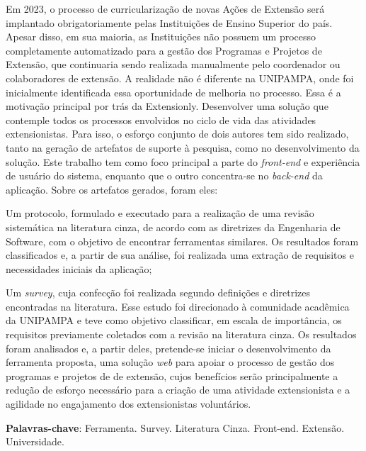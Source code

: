 \begin{resumo}
  Em 2023, o processo de curricularização de novas Ações de Extensão será implantado obrigatoriamente pelas Instituições de Ensino Superior do país. Apesar disso, em sua maioria, as Instituições não possuem um processo completamente automatizado para a gestão dos Programas e Projetos de Extensão, que continuaria sendo realizada manualmente pelo coordenador ou colaboradores de extensão. A realidade não é diferente na \acs{UNIPAMPA}, onde foi inicialmente identificada essa oportunidade de melhoria no processo. Essa é a motivação principal por trás da Extensionly. Desenvolver uma solução que contemple todos os processos envolvidos no ciclo de vida das atividades extensionistas. Para isso, o esforço conjunto de dois autores tem sido realizado, tanto na geração de artefatos de suporte à pesquisa, como no desenvolvimento da solução. Este trabalho tem como foco principal a parte do \textit{front-end} e experiência de usuário do sistema, enquanto que o outro concentra-se no \textit{back-end} da aplicação. Sobre os artefatos gerados, foram eles:
  \begin{inparaenum}[(a)]
    \item Um protocolo, formulado e executado para a realização de uma revisão sistemática na literatura cinza, de acordo com as diretrizes da Engenharia de Software, com o objetivo de encontrar ferramentas similares. Os resultados foram classificados e, a partir de sua análise, foi realizada uma extração de requisitos e necessidades iniciais da aplicação;
    \item Um \textit{survey}, cuja confecção foi realizada segundo definições e diretrizes encontradas na literatura. Esse estudo foi direcionado à comunidade acadêmica da \ac{UNIPAMPA} e teve como objetivo classificar, em escala de importância, os requisitos previamente coletados com a revisão na literatura cinza. Os resultados foram analisados e, a partir deles, pretende-se iniciar o desenvolvimento da ferramenta proposta, uma solução \textit{web} para apoiar o processo de gestão dos programas e projetos de de extensão, cujos benefícios serão principalmente a redução de esforço necessário para a criação de uma atividade extensionista e a agilidade no engajamento dos extensionistas voluntários.
  \end{inparaenum}

  \vspace{\onelineskip}

  \noindent
  \textbf{Palavras-chave}: Ferramenta. Survey. Literatura Cinza. Front-end. Extensão. Universidade.
\end{resumo}
